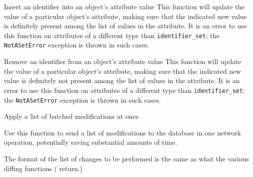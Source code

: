 \documentclass[deska]{subfiles}
\begin{document}
    {}
    {Insert an identifier into an object's attribute value}
    {This function will update the value of a particular object's attribute, making sure that the indicated new value is
    definitely present among the list of values in the attribute.  It is an error to use this function on attributes of
    a different type than {\tt identifier\_set}; the {\tt NotASetError} exception is thrown in such cases.}

    {}
    {Remove an identifier from an object's attribute value}
    {This function will update the value of a particular object's attribute, making sure that the indicated new value is
    definitely not present among the list of values in the attribute.  It is an error to use this function on attributes
    of a different type than {\tt identifier\_set}; the {\tt NotASetError} exception is thrown in such cases.}

    {}
    {Apply a list of batched modifications at once}
    {Use this function to send a list of modifications to the database in one network operation, potentially saving
    substantial amounts of time.

    The format of the list of changes to be performed is the same as what the various diffing functions (
     return.)
    }
\end{document}
